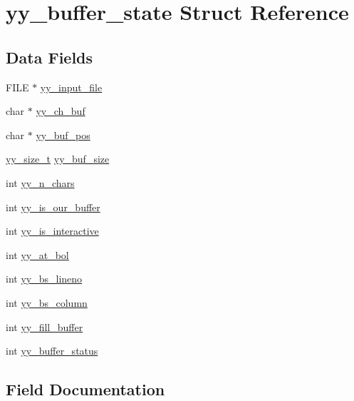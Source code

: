 \hypertarget{structyy__buffer__state}{}\section{yy\+\_\+buffer\+\_\+state Struct Reference}
\label{structyy__buffer__state}
\subsection*{Data Fields}
\begin{DoxyCompactItemize}
\item 
F\+I\+LE $\ast$ \hyperlink{structyy__buffer__state_afb2a40bf9a1b84be81d8e8c0bbcbee21}{yy\+\_\+input\+\_\+file}
\item 
char $\ast$ \hyperlink{structyy__buffer__state_af61a9e79f8fc1edb3ae8a2fa2952ce22}{yy\+\_\+ch\+\_\+buf}
\item 
char $\ast$ \hyperlink{structyy__buffer__state_ae8850ab3d90f9339c392020e7d83c4c7}{yy\+\_\+buf\+\_\+pos}
\item 
\hyperlink{lex_8yy_8c_ad557845057f187eec4be07e2717d2afa}{yy\+\_\+size\+\_\+t} \hyperlink{structyy__buffer__state_a98a79041ff2a95eaa8a5c6d1e1562306}{yy\+\_\+buf\+\_\+size}
\item 
int \hyperlink{structyy__buffer__state_aa86c122f2050dbfd365fcf547e6fc1c3}{yy\+\_\+n\+\_\+chars}
\item 
int \hyperlink{structyy__buffer__state_a1e64bbdc1343d886bee3af97e19644bc}{yy\+\_\+is\+\_\+our\+\_\+buffer}
\item 
int \hyperlink{structyy__buffer__state_a2a823a361fbbe1af51a957d0d0cbf4e2}{yy\+\_\+is\+\_\+interactive}
\item 
int \hyperlink{structyy__buffer__state_a8e60af6806593faf52d1cc01148af6e3}{yy\+\_\+at\+\_\+bol}
\item 
int \hyperlink{structyy__buffer__state_a59c414c619ca0071fe3a091336106d82}{yy\+\_\+bs\+\_\+lineno}
\item 
int \hyperlink{structyy__buffer__state_ad9867983bbc1666304d83623cd6e3dd8}{yy\+\_\+bs\+\_\+column}
\item 
int \hyperlink{structyy__buffer__state_a5e492694db97a0d7760d8cc5fd058dfd}{yy\+\_\+fill\+\_\+buffer}
\item 
int \hyperlink{structyy__buffer__state_a6ca09e676a787676260c558a0f731285}{yy\+\_\+buffer\+\_\+status}
\end{DoxyCompactItemize}


\subsection{Field Documentation}
